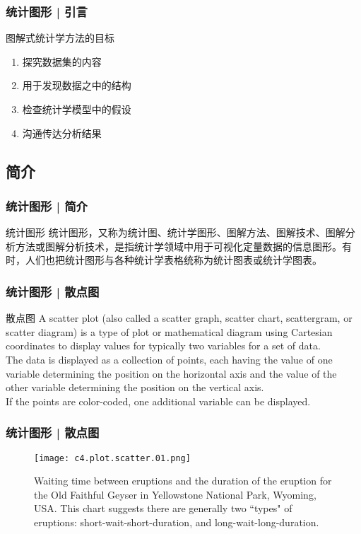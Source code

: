 \begin{frame}
  \frametitle{统计图形 | 引言}
  \begin{block}{图解式统计学方法的目标}
    \begin{enumerate}
      \item 探究数据集的内容
      \item 用于发现数据之中的结构
      \item 检查统计学模型中的假设
      \item 沟通传达分析结果
    \end{enumerate}
  \end{block}
\end{frame}

\subsection{简介}
\begin{frame}
  \frametitle{统计图形 | 简介}
  \begin{block}{统计图形}
统计图形，又称为统计图、统计学图形、图解方法、图解技术、图解分析方法或图解分析技术，是指统计学领域中用于可视化定量数据的信息图形。有时，人们也把统计图形与各种统计学表格统称为统计图表或统计学图表。
  \end{block}
\end{frame}

\begin{frame}
  \frametitle{统计图形 | 散点图}
  \begin{block}{散点图}
    A scatter plot (also called a scatter graph, scatter chart, scattergram, or scatter diagram) is a type of plot or mathematical diagram using Cartesian coordinates to display values for typically two variables for a set of data.\\
    \vspace{0.5em}
    The data is displayed as a collection of points, each having the value of one variable determining the position on the horizontal axis and the value of the other variable determining the position on the vertical axis.\\
    \vspace{0.5em}
    If the points are color-coded, one additional variable can be displayed.
  \end{block}
\end{frame}

\begin{frame}
  \frametitle{统计图形 | 散点图}
  \begin{figure}
    \centering
    \texttt{[image: c4.plot.scatter.01.png]}
    \caption{Waiting time between eruptions and the duration of the eruption for the Old Faithful Geyser in Yellowstone National Park, Wyoming, USA. This chart suggests there are generally two ``types" of eruptions: short-wait-short-duration, and long-wait-long-duration.}
  \end{figure}
\end{frame}


